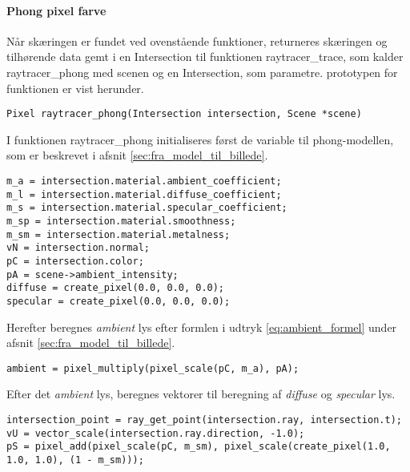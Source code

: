 \paragraph{Phong pixel farve}
Når skæringen er fundet ved ovenstående funktioner, returneres skæringen og tilhørende data gemt i en Intersection til funktionen raytracer\_trace, som kalder raytracer\_phong med scenen og en Intersection, som parametre. prototypen for funktionen er vist herunder.

\begin{lstlisting}[style=Cstyle, caption=prototypen til funktionen der beregner pixelfarven på baggrund af data fra skæring med scenen.]
Pixel raytracer_phong(Intersection intersection, Scene *scene)
\end{lstlisting}

I funktionen raytracer\_phong initialiseres først de variable til phong-modellen, som er beskrevet i afsnit
 \ref{sec:fra_model_til_billede}.

\begin{lstlisting}[style=Cstyle, caption=Initialisering af variabler i raytracer\_phong.] 
m_a = intersection.material.ambient_coefficient;
m_l = intersection.material.diffuse_coefficient;
m_s = intersection.material.specular_coefficient;
m_sp = intersection.material.smoothness;
m_sm = intersection.material.metalness;
vN = intersection.normal;
pC = intersection.color;
pA = scene->ambient_intensity;
diffuse = create_pixel(0.0, 0.0, 0.0);
specular = create_pixel(0.0, 0.0, 0.0);
\end{lstlisting}

Herefter beregnes \textit{ambient} lys efter formlen i udtryk \ref{eq:ambient_formel} under afsnit \ref{sec:fra_model_til_billede}.

\begin{lstlisting}[style=Cstyle, caption=Beregning af ambient lys i raytracer\_phong.] 
ambient = pixel_multiply(pixel_scale(pC, m_a), pA);
\end{lstlisting}

Efter det \textit{ambient} lys, beregnes vektorer til beregning af \textit{diffuse} og \textit{specular} lys.

\begin{lstlisting}[style=Cstyle, caption={Beregning af skæring, vektor $\protect\vv{U}$ og pixel S i raytracer\_phong.}] 
intersection_point = ray_get_point(intersection.ray, intersection.t);
vU = vector_scale(intersection.ray.direction, -1.0);
pS = pixel_add(pixel_scale(pC, m_sm), pixel_scale(create_pixel(1.0, 1.0, 1.0), (1 - m_sm)));
\end{lstlisting}

